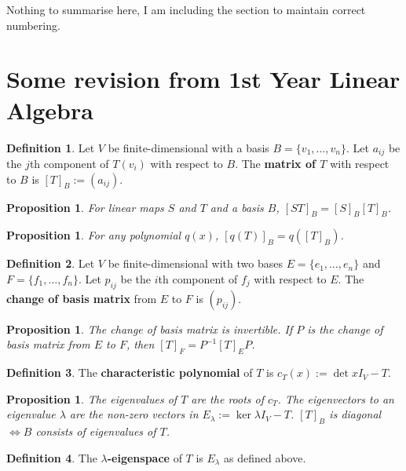 \documentclass[12pt]{article}
\newtheorem{prop}[thm]{Proposition}
\newtheorem*{prop*}{Proposition}
\theoremstyle{definition}
\newtheorem*{defn*}{Definition}
\begin{document}
\noindent Nothing to summarise here, I am including the section to maintain correct numbering.

\section{Some revision from 1st Year Linear Algebra}

\begin{defn*}
	Let $V$ be finite-dimensional with a basis $B = \{v_1, \ldots, v_n\}$.
	Let $a_{ij}$ be the $j$th component of $T(v_i)$ with respect to $B$.
	The \textbf{matrix of $T$} with respect to $B$ is $[T]_B := (a_{ij})$.
\end{defn*}

\begin{prop}
	For linear maps $S$ and $T$ and a basis $B$, $[ST]_B = [S]_B[T]_B$.
\end{prop}

\begin{prop*}
	For any polynomial $q(x)$, $[q(T)]_B = q([T]_B)$.
\end{prop*}

\begin{defn*}
	Let $V$ be finite-dimensional with two bases $E = \{e_1, \ldots, e_n\}$ and $F = \{f_1, \ldots, f_n\}$.
	Let $p_{ij}$ be the $i$th component of $f_j$ with respect to $E$.
	The \textbf{change of basis matrix} from $E$ to $F$ is $(p_{ij})$.
\end{defn*}

\begin{prop}
	The change of basis matrix is invertible.
	If $P$ is the change of basis matrix from $E$ to $F$, then $[T]_F = P^{-1}[T]_EP$.
\end{prop}

\begin{defn*}
	The \textbf{characteristic polynomial} of $T$ is $c_T(x) := \det{xI_V - T}$.
\end{defn*}

\begin{prop}
	The eigenvalues of $T$ are the roots of $c_T$.
	The eigenvectors to an eigenvalue $\lambda$ are the non-zero vectors in $E_{\lambda} := \ker{\lambda I_V - T}$.
	$[T]_B$ is diagonal $\iff B$ consists of eigenvalues of $T$.
\end{prop}

\begin{defn*}
	The \textbf{$\lambda$-eigenspace} of $T$ is $E_{\lambda}$ as defined above.
\end{defn*}
\end{document}
